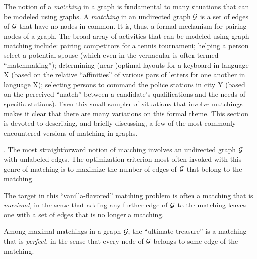 The notion of a {\it matching} in a graph is fundamental to many
situations that can be modeled using graphs.  A {\it matching} in an
undirected graph $\mbox{$\cal G$}$ is a set of edges of $\mbox{$\cal G$}$ that have no nodes in
common.  It is, thus, a formal mechanism for pairing nodes of a graph.
The broad array of activities that can be modeled using graph matching
include: pairing competitors for a tennis tournament; helping a person
select a potential spouse (which even in the vernacular is often
termed ``matchmaking''); determining (near-)optimal layouts for a
keyboard in language X (based on the relative ``affinities'' of
various pars of letters for one another in language X); selecting
persons to command the police stations in city Y (based on the
perceived ``match'' between a candidate's qualifications and the needs
of specific stations).  Even this small sampler of situations that
involve matchings makes it clear that there are many variations on
this formal theme.  This section is devoted to describing, and briefly
discussing, a few of the most commonly encountered versions of
matching in graphs.
\bigskip

\noindent {}
\bigskip

.
The most straightforward notion of matching involves an undirected
graph $\mbox{$\cal G$}$ with unlabeled edges.  The optimization criterion most
often invoked with this genre of matching is to maximize the number of
edges of $\mbox{$\cal G$}$ that belong to the matching.

The target in this ``vanilla-flavored'' matching problem is often a
matching that is {\em maximal}, 
 in the sense that
adding any further edge of $\mbox{$\cal G$}$ to the matching leaves one with a set
of edges that is no longer a matching.

Among maximal matchings in a graph $\mbox{$\cal G$}$, the ``ultimate treasure'' is
a matching that is {\it perfect},  in
the sense that every node of $\mbox{$\cal G$}$ belongs to some edge of the
matching.

